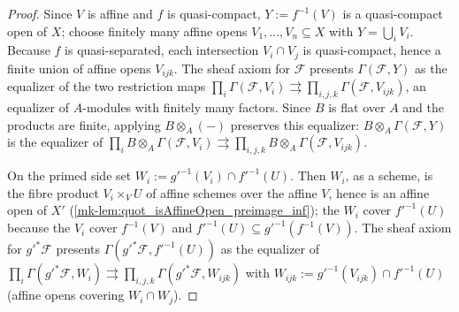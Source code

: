\begin{proof}
  \leanok{}
  Since \(V\) is affine and \(f\) is quasi-compact, \(Y := f^{-1}(V)\) is a
  quasi-compact open of \(X\); choose finitely many affine opens
  \(V_1, \dots, V_n \subseteq X\) with \(Y = \bigcup_i V_i\). Because \(f\)
  is quasi-separated, each intersection \(V_i \cap V_j\) is quasi-compact,
  hence a finite union of affine opens \(V_{ijk}\). The sheaf axiom for
  \(\mathcal F\) presents \(\Gamma(\mathcal F, Y)\) as the equalizer of the
  two restriction maps
  \(\prod_i \Gamma(\mathcal F, V_i) \rightrightarrows
    \prod_{i,j,k} \Gamma(\mathcal F, V_{ijk})\),
  an equalizer of \(A\)-modules with finitely many factors. Since \(B\) is
  flat over \(A\) and the products are finite, applying
  \(B \otimes_A (-)\) preserves this equalizer:
  \(B \otimes_A \Gamma(\mathcal F, Y)\) is the equalizer of
  \(\prod_i B \otimes_A \Gamma(\mathcal F, V_i) \rightrightarrows
    \prod_{i,j,k} B \otimes_A \Gamma(\mathcal F, V_{ijk})\).

  On the primed side set \(W_i := g'^{-1}(V_i) \cap f'^{-1}(U)\). Then
  \(W_i\), as a scheme, is the fibre product \(V_i \times_V U\) of affine
  schemes over the affine \(V\), hence is an affine open of \(X'\)
  (\ref{mk-lem:quot_isAffineOpen_preimage_inf}); the
  \(W_i\) cover \(f'^{-1}(U)\) because the \(V_i\) cover \(f^{-1}(V)\) and
  \(f'^{-1}(U) \subseteq g'^{-1}(f^{-1}(V))\). The sheaf axiom for
  \(g'^* \mathcal F\) presents \(\Gamma(g'^*\mathcal F, f'^{-1}(U))\) as the
  equalizer of
  \(\prod_i \Gamma(g'^*\mathcal F, W_i) \rightrightarrows
    \prod_{i,j,k} \Gamma(g'^*\mathcal F, W_{ijk})\)
  with \(W_{ijk} := g'^{-1}(V_{ijk}) \cap f'^{-1}(U)\) (affine opens
  covering \(W_i \cap W_j\)).


\end{proof}
